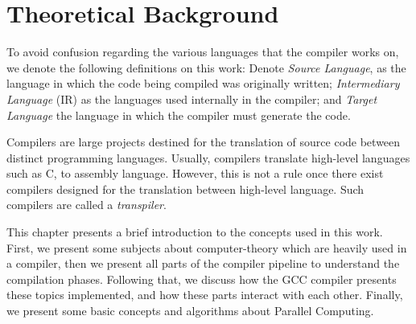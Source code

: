 \chapter{Theoretical Background}
\label{chap:fundamentacao}

To avoid confusion regarding the various languages that the compiler works on,
we denote the following definitions on this work: Denote \textit{Source
Language}, as the language in which the code being compiled was originally
written; \textit{Intermediary Language} (IR) as the languages used internally in the
compiler; and \textit{Target Language} the language in which the compiler must
generate the code.

Compilers are large projects destined for the translation of source code
between distinct programming languages. Usually, compilers translate high-level
languages such as C, to assembly language. However, this is not a rule once
there exist compilers designed for the translation between high-level language.
Such compilers are called a \textit{transpiler}.

This chapter presents a brief introduction to the concepts used in this work.
First, we present some subjects about computer-theory which are heavily
used in a compiler, then we present all parts of the compiler pipeline
to understand the compilation phases. Following that, we discuss how the
GCC compiler presents these topics implemented, and how these parts interact
with each other.  Finally, we present some basic concepts and algorithms about
Parallel Computing.



